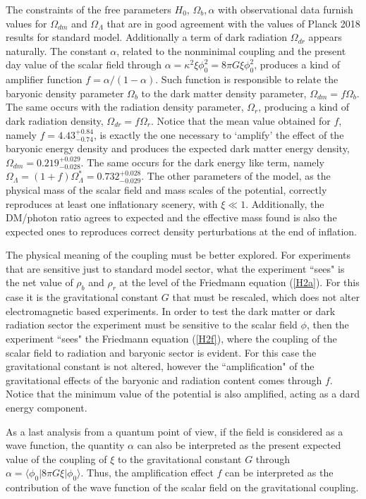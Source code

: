 \documentclass[preprintnumbers,amsmath,amssymb,nofootinbib]{revtex4}
\begin{document}
The constraints of the free parameters $H_0, \,\Omega_b, \alpha$ with observational data furnish values for $\Omega_{dm}$ and $\Omega_{\Lambda}$ that are in good agreement with the values of Planck 2018 results for standard model. Additionally a term of dark radiation $\Omega_{dr}$ appears naturally. The constant $\alpha$, related to the nonminimal coupling and the present day value of the scalar field through $\alpha = \kappa^2\xi\phi_0^2 = 8\pi G \xi \phi_0^2$, produces a kind of amplifier function $f = \alpha/(1-\alpha)$. Such function is responsible to relate the baryonic density parameter $\Omega_b$ to the dark matter density parameter, $\Omega_{dm}=f\Omega_{b}$. The same occurs with the radiation density parameter, $\Omega_{r}$, producing a kind of dark radiation density,  $\Omega_{dr}=f \Omega_{r}$. Notice that the mean value obtained for $f$, namely $f=4.43^{+0.84}_{-0.74}$, is exactly the one necessary to `amplify' the effect of the baryonic energy density and produces the expected dark matter energy density, $\Omega_{dm}=0.219^{+0.029}_{-0.028}$. The same occurs for the dark energy like term, namely $\Omega_\Lambda=(1+f)\Omega^*_\Lambda =0.732^{+0.028}_{-0.029}$. The other parameters of the model, as the physical mass of the scalar field and mass scales of the potential, correctly reproduces at least one inflationary scenery, with $\xi \ll 1$. Additionally, the DM/photon ratio agrees to expected and the effective mass found is also the expected ones to reproduces correct density perturbations at the end of inflation.

The physical meaning of the coupling must be better explored. For experiments that are sensitive just to standard model sector, what the experiment ``sees" is the net value of $\rho_b$ and $\rho_r$ at the level of the Friedmann equation (\ref{H2a}). For this case it is the gravitational constant $G$ that must be rescaled, which does not alter electromagnetic based experiments.  In order to test the dark matter or dark radiation sector the experiment must be sensitive to the scalar field $\phi$, then the experiment ``sees" the Friedmann equation (\ref{H2f}), where the coupling of the scalar field to radiation and baryonic sector is evident. For this case the gravitational constant is not altered, however the ``amplification" of the gravitational effects of the baryonic and radiation content comes through $f$. Notice that the minimum value of the potential is also amplified, acting as a dard energy component.

As a last analysis from a quantum point of view, if the field is considered as a wave function, the quantity $\alpha$ can also be interpreted as the present expected value of the coupling of $\xi$ to the gravitational constant $G$ through $\alpha = \langle \phi_0 | 8\pi G \xi |\phi_0 \rangle$. Thus, the amplification effect $f$ can be interpreted as the contribution of the wave function of the scalar field on the gravitational coupling. 
\end{document}
